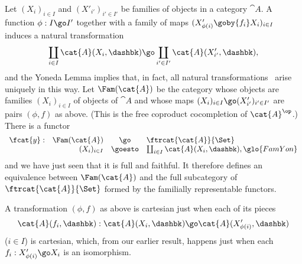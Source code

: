 Let $(X_i)_{i\in I}$ and $(X'_{i'})_{i'\in I'}$ be families of objects in a
category $\cat{A}$.  A function $\phi: I \go I'$ together with a family of
maps $(X'_{\phi(i)} \goby{f_i} X_i)_{i\in I}$ induces%
%
a natural transformation%
%
%
\begin{equation}	\label{eq:fam-rep-transf}
\coprod_{i \in I} \cat{A}(X_i, \dashbk)
\go
\coprod_{i' \in I'} \cat{A}(X'_{i'}, \dashbk),
\end{equation}
%
and the Yoneda Lemma implies that, in fact, all natural
transformations~ arise uniquely in this way.  Let
$\Fam(\cat{A})$%
% 
% 
be the category whose objects are families $(X_i)_{i\in I}$
of objects of $\cat{A}$ and whose maps $(X_i)_{i\in I} \go (X'_{i'})_{i'\in
I'}$ are pairs $(\phi, f)$ as above.  (This is the free coproduct
cocompletion of $\cat{A}^\op$.)  There is a functor
%
\begin{equation}	\label{eq:fam-rep-Yoneda}
\begin{array}{rrcl}
\fcat{y}:	&\Fam(\cat{A})	&\go	&\ftrcat{\cat{A}}{\Set}	\\
		&(X_i)_{i\in I}	&\goesto&
\coprod_{i\in I} \cat{A} (X_i, \dashbk),%
% 
\glo{FamYon}
% 
\end{array}
\end{equation}
%
and we have just seen that it is full and faithful.  It therefore defines
an equivalence between $\Fam(\cat{A})$ and the full subcategory of
$\ftrcat{\cat{A}}{\Set}$ formed by the familially representable functors.

A transformation $(\phi, f)$ as above is cartesian%
%
%
%
%
just when each of its pieces
\[
\cat{A}(f_i, \dashbk):
\cat{A}(X_i, \dashbk)
\go
\cat{A}(X'_{\phi(i)}, \dashbk)
\]
($i\in I$) is cartesian, which, from our earlier result, happens just when
each $f_i: X'_{\phi(i)} \go X_i$ is an isomorphism.


